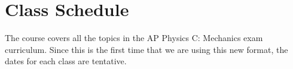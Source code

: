 \documentclass{../../oss-handout}
\begin{document}


\section{Class Schedule}
The course covers all the topics in the AP Physics C: Mechanics exam curriculum.
Since this is the first time that we are using this new  format, the dates
for each class are tentative. %
\end{document}
